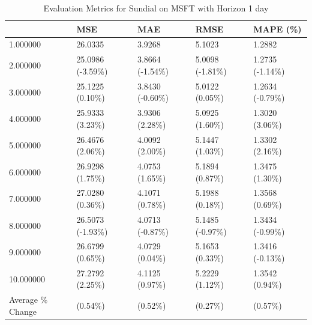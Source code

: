 \begin{table}
\caption{Evaluation Metrics for Sundial on MSFT with Horizon 1 day}
\label{tab:sundial_MSFT_h1_metrics}
\begin{tabular}{lllll}
\toprule
 & MSE & MAE & RMSE & MAPE (\%) \\
\midrule
1.000000 & 26.0335 & 3.9268 & 5.1023 & 1.2882 \\
2.000000 & 25.0986 (-3.59\%) & 3.8664 (-1.54\%) & 5.0098 (-1.81\%) & 1.2735 (-1.14\%) \\
3.000000 & 25.1225 (0.10\%) & 3.8430 (-0.60\%) & 5.0122 (0.05\%) & 1.2634 (-0.79\%) \\
4.000000 & 25.9333 (3.23\%) & 3.9306 (2.28\%) & 5.0925 (1.60\%) & 1.3020 (3.06\%) \\
5.000000 & 26.4676 (2.06\%) & 4.0092 (2.00\%) & 5.1447 (1.03\%) & 1.3302 (2.16\%) \\
6.000000 & 26.9298 (1.75\%) & 4.0753 (1.65\%) & 5.1894 (0.87\%) & 1.3475 (1.30\%) \\
7.000000 & 27.0280 (0.36\%) & 4.1071 (0.78\%) & 5.1988 (0.18\%) & 1.3568 (0.69\%) \\
8.000000 & 26.5073 (-1.93\%) & 4.0713 (-0.87\%) & 5.1485 (-0.97\%) & 1.3434 (-0.99\%) \\
9.000000 & 26.6799 (0.65\%) & 4.0729 (0.04\%) & 5.1653 (0.33\%) & 1.3416 (-0.13\%) \\
10.000000 & 27.2792 (2.25\%) & 4.1125 (0.97\%) & 5.2229 (1.12\%) & 1.3542 (0.94\%) \\
Average \% Change & (0.54\%) & (0.52\%) & (0.27\%) & (0.57\%) \\
\bottomrule
\end{tabular}
\end{table}
